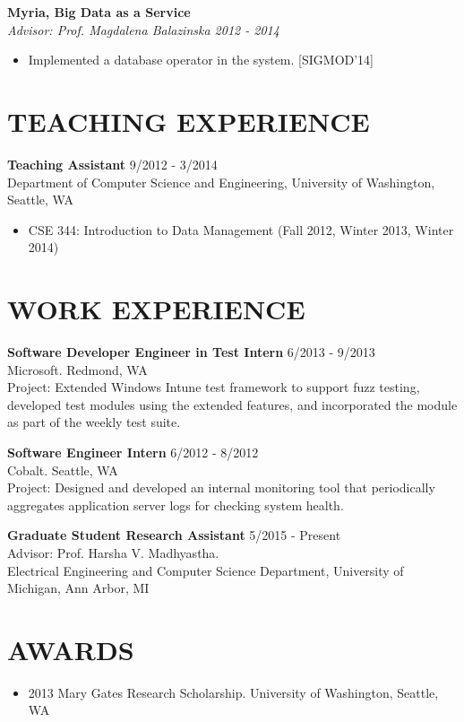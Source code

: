 \documentclass[zhemargin]{res}
\begin{document}
\begin{resume}
	\textbf{Myria, Big Data as a Service}\\
    \textit{Advisor: Prof. Magdalena Balazinska \hfill 2012 - 2014}
	\begin{itemize}
    \item Implemented a database operator in the system. [SIGMOD'14]
	\end{itemize}

\section{\small TEACHING EXPERIENCE}
	\textbf{Teaching Assistant} \hfill 9/2012 - 3/2014 \\
	Department of Computer Science and Engineering, University of Washington, Seattle, WA
	\begin{itemize}
      \item CSE 344: Introduction to Data Management (Fall 2012, Winter 2013, Winter 2014)
	\end{itemize}

\section{\small WORK EXPERIENCE}
    \textbf{Software Developer Engineer in Test Intern} \hfill 6/2013 - 9/2013 \\
    Microsoft. Redmond, WA\\
    Project: Extended Windows Intune test framework to support fuzz testing, developed test modules using the extended features, and incorporated the module as part of the weekly test suite.

    \textbf{Software Engineer Intern} \hfill 6/2012 - 8/2012 \\
    Cobalt. Seattle, WA\\
    Project: Designed and developed an internal monitoring tool that periodically aggregates application server logs for checking system health.

    \textbf{Graduate Student Research Assistant} \hfill 5/2015 - Present \\
    Advisor: Prof. Harsha V. Madhyastha.\\
    Electrical Engineering and Computer Science Department, University of Michigan, Ann Arbor, MI

\section{\small AWARDS}
	\begin{itemize}[leftmargin=*, topsep=-10pt] %
    \item 2013 Mary Gates Research Scholarship. University of Washington, Seattle, WA
	\end{itemize}


\end{resume}
\end{document}
